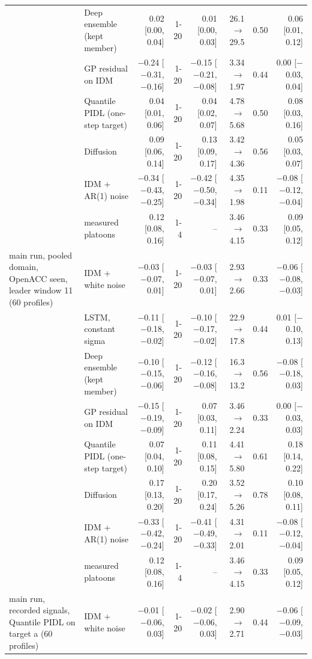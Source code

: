 \begin{longtable}{llrrrrrr}
 & Deep ensemble (kept member) & 0.02 [0.00, 0.04] & 1-20 & 0.01 [0.00, 0.03] & 26.1 $\rightarrow$ 29.5 & 0.50 & 0.06 [0.01, 0.12] \\
 & GP residual on IDM & $-$0.24 [$-$0.31, $-$0.16] & 1-20 & $-$0.15 [$-$0.21, $-$0.08] & 3.34 $\rightarrow$ 1.97 & 0.44 & 0.00 [$-$0.03, 0.04] \\
 & Quantile PIDL (one-step target) & 0.04 [0.01, 0.06] & 1-20 & 0.04 [0.02, 0.07] & 4.78 $\rightarrow$ 5.68 & 0.50 & 0.08 [0.03, 0.16] \\
 & Diffusion & 0.09 [0.06, 0.14] & 1-20 & 0.13 [0.09, 0.17] & 3.42 $\rightarrow$ 4.36 & 0.56 & 0.05 [0.03, 0.07] \\
 & IDM + AR(1) noise & $-$0.34 [$-$0.43, $-$0.25] & 1-20 & $-$0.42 [$-$0.50, $-$0.34] & 4.35 $\rightarrow$ 1.98 & 0.11 & $-$0.08 [$-$0.12, $-$0.04] \\
 & measured platoons & 0.12 [0.08, 0.16] & 1-4 & -- & 3.46 $\rightarrow$ 4.15 & 0.33 & 0.09 [0.05, 0.12] \\
\midrule
main run, pooled domain, OpenACC seen, leader window 11 (60 profiles) & IDM + white noise & $-$0.03 [$-$0.07, 0.01] & 1-20 & $-$0.03 [$-$0.07, 0.01] & 2.93 $\rightarrow$ 2.66 & 0.33 & $-$0.06 [$-$0.08, $-$0.03] \\
 & LSTM, constant sigma & $-$0.11 [$-$0.18, $-$0.02] & 1-20 & $-$0.10 [$-$0.17, $-$0.02] & 22.9 $\rightarrow$ 17.8 & 0.44 & 0.01 [$-$0.10, 0.13] \\
 & Deep ensemble (kept member) & $-$0.10 [$-$0.15, $-$0.06] & 1-20 & $-$0.12 [$-$0.16, $-$0.08] & 16.3 $\rightarrow$ 13.2 & 0.56 & $-$0.08 [$-$0.18, 0.03] \\
 & GP residual on IDM & $-$0.15 [$-$0.19, $-$0.09] & 1-20 & 0.07 [0.03, 0.11] & 3.46 $\rightarrow$ 2.24 & 0.33 & 0.00 [$-$0.03, 0.03] \\
 & Quantile PIDL (one-step target) & 0.07 [0.04, 0.10] & 1-20 & 0.11 [0.08, 0.15] & 4.41 $\rightarrow$ 5.80 & 0.61 & 0.18 [0.14, 0.22] \\
 & Diffusion & 0.17 [0.13, 0.20] & 1-20 & 0.20 [0.17, 0.24] & 3.52 $\rightarrow$ 5.26 & 0.78 & 0.10 [0.08, 0.11] \\
 & IDM + AR(1) noise & $-$0.33 [$-$0.42, $-$0.24] & 1-20 & $-$0.41 [$-$0.49, $-$0.33] & 4.31 $\rightarrow$ 2.01 & 0.11 & $-$0.08 [$-$0.12, $-$0.04] \\
 & measured platoons & 0.12 [0.08, 0.16] & 1-4 & -- & 3.46 $\rightarrow$ 4.15 & 0.33 & 0.09 [0.05, 0.12] \\
\midrule
main run, recorded signals, Quantile PIDL on target a (60 profiles) & IDM + white noise & $-$0.01 [$-$0.06, 0.03] & 1-20 & $-$0.02 [$-$0.06, 0.03] & 2.90 $\rightarrow$ 2.71 & 0.44 & $-$0.06 [$-$0.09, $-$0.03] \\

\end{longtable}
